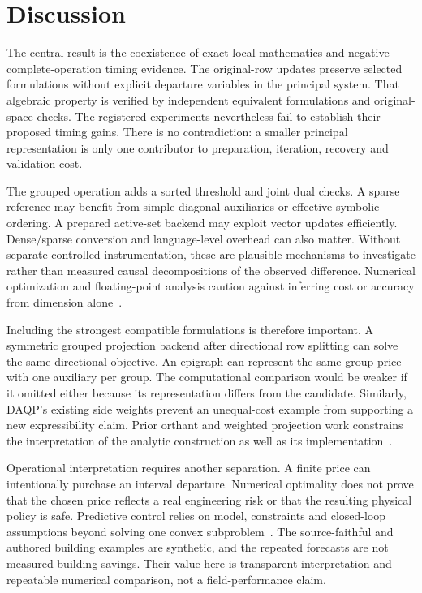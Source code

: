 \section{Discussion}\label{sec:discussion}
The central result is the coexistence of exact local mathematics
and negative complete-operation timing evidence. The original-row
updates preserve selected formulations without explicit departure
variables in the principal system. That algebraic property is
verified by independent equivalent formulations and original-space
checks. The registered experiments nevertheless fail to establish
their proposed timing gains. There is no contradiction: a smaller
principal representation is only one contributor to preparation,
iteration, recovery and validation cost.

The grouped operation adds a sorted threshold and joint dual
checks. A sparse reference may benefit from simple diagonal
auxiliaries or effective symbolic ordering. A prepared active-set
backend may exploit vector updates efficiently. Dense/sparse
conversion and language-level overhead can also matter. Without
separate controlled instrumentation, these are plausible mechanisms
to investigate rather than measured causal decompositions of the
observed difference. Numerical optimization and floating-point
analysis caution against inferring cost or accuracy from dimension
alone~\cite{nocedal,higham}.

Including the strongest compatible formulations is therefore
important. A symmetric grouped projection backend after directional
row splitting can solve the same directional objective. An epigraph
can represent the same group price with one auxiliary per group.
The computational comparison would be weaker if it omitted either
because its representation differs from the candidate. Similarly,
DAQP's existing side weights prevent an unequal-cost example from
supporting a new expressibility claim. Prior orthant and weighted
projection work constrains the interpretation of the analytic
construction as well as its implementation~\cite{orthant,weighted}.

Operational interpretation requires another separation. A finite
price can intentionally purchase an interval departure. Numerical
optimality does not prove that the chosen price reflects a real
engineering risk or that the resulting physical policy is safe.
Predictive control relies on model, constraints and closed-loop
assumptions beyond solving one convex subproblem~\cite{mayne,rawlings}.
The source-faithful and authored building examples are synthetic,
and the repeated forecasts are not measured building savings.
Their value here is transparent interpretation and repeatable
numerical comparison, not a field-performance claim.

